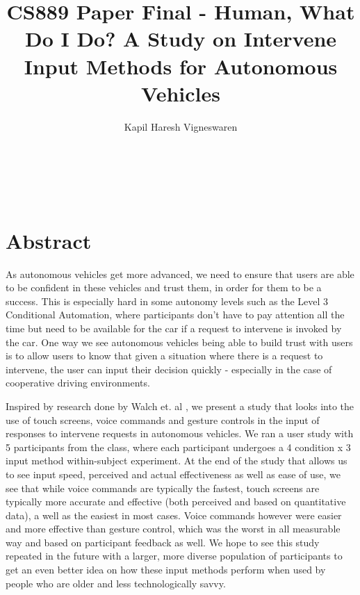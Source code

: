 \documentclass{sigchi}
\begin{document}
\title{
CS889 Paper Final - Human, What Do I Do? A Study on Intervene Input Methods for Autonomous Vehicles}

\author{
  \alignauthor Kapil Haresh Vigneswaren\\
    \\
    \\
    \\
    \\
}


\maketitle

\section{Abstract}

As autonomous vehicles get more advanced, we need to ensure that users are able to be confident in these vehicles and trust them, in order for them to be a success. This is especially hard in some autonomy levels such as the Level 3 Conditional Automation, where participants don't have to pay attention all the time but need to be available for the car if a request to intervene is invoked by the car. One way we see autonomous vehicles being able to build trust with users is to allow users to know that given a situation where there is a request to intervene, the user can input their decision quickly - especially in the case of cooperative driving environments.

Inspired by research done by Walch et. al \cite{Walch2016}, we present a study that looks into the use of touch screens, voice commands and gesture controls in the input of responses to intervene requests in autonomous vehicles. We ran a user study with 5 participants from the class, where each participant undergoes a 4 condition x 3 input method within-subject experiment. At the end of the study that allows us to see input speed, perceived and actual effectiveness as well as ease of use, we see that while voice commands are typically the fastest, touch screens are typically more accurate and effective (both perceived and based on quantitative data), a well as the easiest in most cases. Voice commands however were easier and more effective than gesture control, which was the worst in all measurable way and based on participant feedback as well. We hope to see this study repeated in the future with a larger, more diverse population of participants to get an even better idea on how these input methods perform when used by people who are older and less technologically savvy.
\end{document}
